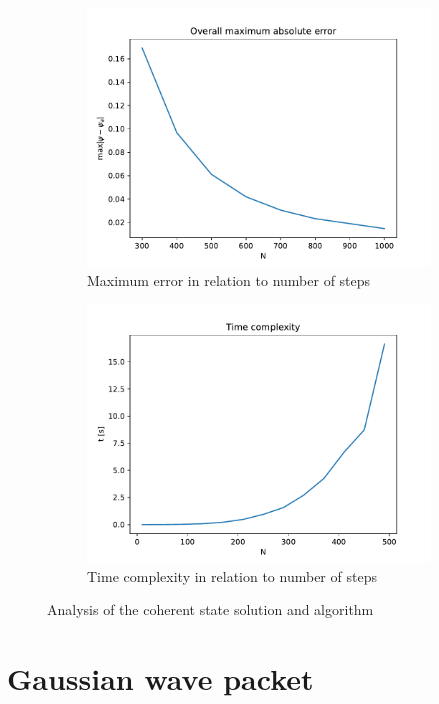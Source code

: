 \documentclass[12pt, a4paper]{article}
\begin{document}
\begin{figure}[hbtp]
\begin{subfigure}{0.5\textwidth}
  \includegraphics[width=\linewidth]{error_vs_N.pdf}
  \caption{Maximum error in relation to number of steps} \label{fig:c}
  \end{subfigure}
  \hspace*{\fill}
  \begin{subfigure}{0.5\textwidth}
  \includegraphics[width=\linewidth]{time_vs_N.pdf}
  \caption{Time complexity in relation to number of steps} \label{fig:d}
  \end{subfigure}
  \caption{Analysis of the coherent state solution and algorithm} \label{fig:1}
\end{figure}
 

\section{Gaussian wave packet}
\end{document}
